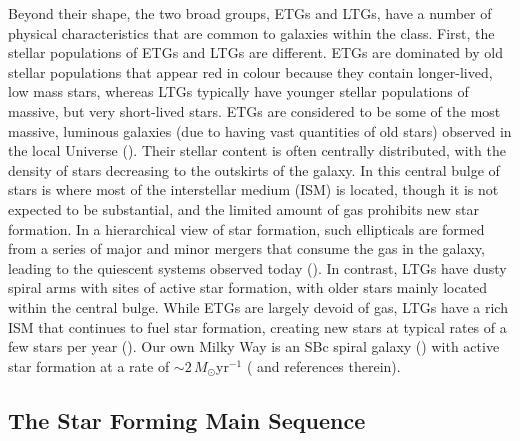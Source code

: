 Beyond their shape, the two broad groups, ETGs and LTGs, have a number of physical characteristics that are common to galaxies within the class. First, the stellar populations of ETGs and LTGs are different. ETGs are dominated by old stellar populations that appear red in colour because they contain longer-lived, low mass stars, whereas LTGs typically have younger stellar populations of massive, but very short-lived stars. ETGs are considered to be some of the most massive, luminous galaxies (due to having vast quantities of old stars) observed in the local Universe (\citealt{Bernardi_2003, Kelvin_2014, Moffett_2016}). Their stellar content is often centrally distributed, with the density of stars decreasing to the outskirts of the galaxy. In this central bulge of stars is where most of the interstellar medium (ISM) is located, though it is not expected to be substantial, and the limited amount of gas prohibits new star formation. In a hierarchical view of star formation, such ellipticals are formed from a series of major and minor mergers that consume the gas in the galaxy, leading to the quiescent systems observed today (\citealt{Toomre_1972}). In contrast, LTGs have dusty spiral arms with sites of active star formation, with older stars mainly located within the central bulge. While ETGs are largely devoid of gas, LTGs have a rich ISM that continues to fuel star formation, creating new stars at typical rates of a few stars per year (\citealt{Kennicutt_1983, Gao_2004}). Our own Milky Way is an SBc spiral galaxy (\citealt{Gerhard_2002}) with active star formation at a rate of $\sim 2\,M_\odot$yr$^{-1}$ (\citealt{Noriega-Crespo_2013, Licquia_2015, Elia_2022} and references therein).

\subsection{The Star Forming Main Sequence}

